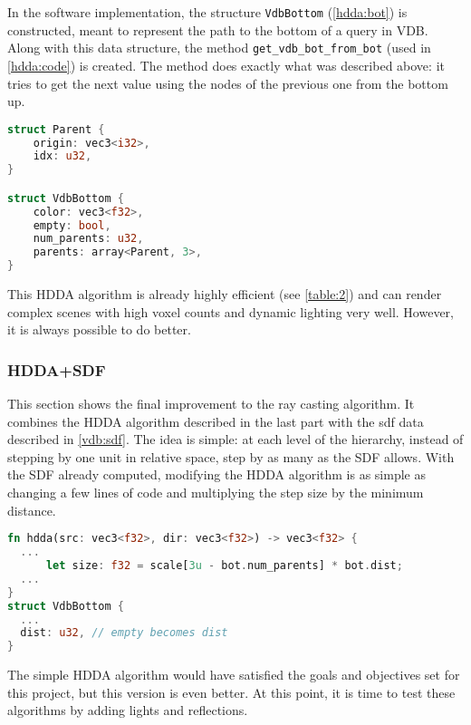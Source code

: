 In the software implementation, the structure \texttt{VdbBottom} (\cref{hdda:bot}) is constructed, meant to represent the path to the bottom of a query in VDB.
Along with this data structure, the method \linebreak \texttt{get\_vdb\_bot\_from\_bot} (used in \cref{hdda:code}) is created.
The method does exactly what was described above: it tries to get the next value using the nodes of the previous one from the bottom up.

\begin{lstlisting}[language=rust, captionpos=b, caption={
    \texttt{VdbBottom} defintion.
    The structure holds the three (or fewer) parents that the bottom value has, whether the bottom was an empty value, and the colour information if it was voxel.
  }, label={hdda:bot}]
struct Parent {
    origin: vec3<i32>,
    idx: u32,
}

struct VdbBottom {
    color: vec3<f32>,
    empty: bool,
    num_parents: u32,
    parents: array<Parent, 3>,
}
\end{lstlisting}

This HDDA algorithm is already highly efficient (see \cref{table:2}) and can render complex scenes with high voxel counts and dynamic lighting very well. However, it is always possible to do better.

\subsubsection{HDDA+SDF}
This section shows the final improvement to the ray casting algorithm.
It combines the HDDA algorithm described in the last part with the \acrshort{sdf} data described in \cref{vdb:sdf}.
The idea is simple: at each level of the hierarchy, instead of stepping by one unit in relative space, step by as many as the SDF allows.
With the SDF already computed, modifying the HDDA algorithm is as simple as changing a few lines of code and multiplying the step size by the minimum distance.

\begin{lstlisting}[language=rust, caption={HDDA+SDF tweaks}, captionpos=b]
fn hdda(src: vec3<f32>, dir: vec3<f32>) -> vec3<f32> {
  ...
      let size: f32 = scale[3u - bot.num_parents] * bot.dist;
  ...
}
struct VdbBottom {
  ...
  dist: u32, // empty becomes dist
}
\end{lstlisting}

The simple HDDA algorithm would have satisfied the goals and objectives set for this project, but this version is even better. At this point, it is time to test these algorithms by adding lights and reflections.

